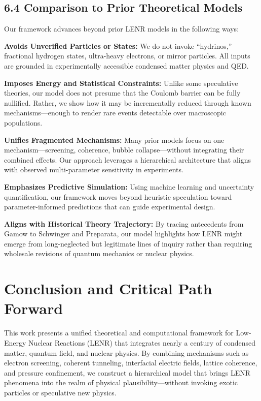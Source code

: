     \subsection{6.4 Comparison to Prior Theoretical Models}
    
    Our framework advances beyond prior LENR models in the following ways:
    
    \textbf{Avoids Unverified Particles or States:} We do not invoke “hydrinos,” fractional hydrogen states, ultra-heavy electrons, or mirror particles. All inputs are grounded in experimentally accessible condensed matter physics and QED.
    
    \textbf{Imposes Energy and Statistical Constraints:} Unlike some speculative theories, our model does not presume that the Coulomb barrier can be fully nullified. Rather, we show how it may be incrementally reduced through known mechanisms—enough to render rare events detectable over macroscopic populations.
    
    \textbf{Unifies Fragmented Mechanisms:} Many prior models focus on one mechanism—screening, coherence, bubble collapse—without integrating their combined effects. Our approach leverages a hierarchical architecture that aligns with observed multi-parameter sensitivity in experiments.
    
    \textbf{Emphasizes Predictive Simulation:} Using machine learning and uncertainty quantification, our framework moves beyond heuristic speculation toward parameter-informed predictions that can guide experimental design.
    
    \textbf{Aligns with Historical Theory Trajectory:} By tracing antecedents from Gamow to Schwinger and Preparata, our model highlights how LENR might emerge from long-neglected but legitimate lines of inquiry rather than requiring wholesale revisions of quantum mechanics or nuclear physics.
    
    \section{Conclusion and Critical Path Forward}
    
    This work presents a unified theoretical and computational framework for Low-Energy Nuclear Reactions (LENR) that integrates nearly a century of condensed matter, quantum field, and nuclear physics. By combining mechanisms such as electron screening, coherent tunneling, interfacial electric fields, lattice coherence, and pressure confinement, we construct a hierarchical model that brings LENR phenomena into the realm of physical plausibility—without invoking exotic particles or speculative new physics.
    
